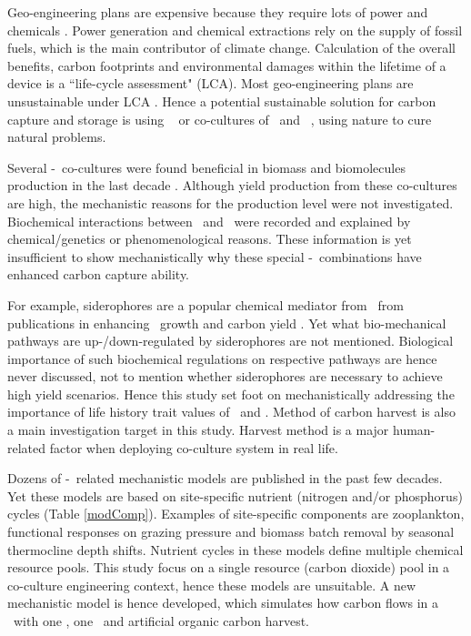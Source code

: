 \documentclass[../thesis.tex]{subfiles} %
\begin{document}
Geo-engineering plans are expensive because they require lots of power and chemicals \autocite{boyd2008ranking,boyd2008implications,mcclellan2012cost}.  Power generation and chemical extractions rely on the supply of fossil fuels, which is the main contributor of climate change.  Calculation of the overall benefits, carbon footprints and environmental damages within the lifetime of a device is a ``life-cycle assessment" (LCA).  Most geo-engineering plans are unsustainable under LCA \autocite{abdussalam2020green}.  Hence a potential sustainable solution for carbon capture and storage is using \phy\ \autocite{farrelly2013carbon} or co-cultures of \phy\ and \bac\ \autocite{fuentes2016impact}, using nature to cure natural problems.

Several \phy-\bac\ co-cultures were found beneficial in biomass and biomolecules production in the last decade \autocite{fuentes2016impact,santos2014microalgal}.  Although yield production from these co-cultures are high, the mechanistic reasons for the production level were not investigated.  Biochemical interactions between \phy\ and \bac\ were recorded and explained by chemical/genetics \autocite{amin2009photolysis,durham2015cryptic,leyva2014accumulation,rivas2010interactions,seyedsayamdost2011roseobacticides} or phenomenological \autocite{choix2012enhanced1,choix2012enhanced2,kazamia2012mutualistic,santos2014microalgal} reasons.  These information is yet insufficient to show mechanistically why these special \phy-\bac\ combinations have enhanced carbon capture ability.

For example, siderophores are a popular chemical mediator from \bac\ from publications in enhancing \phy\ growth and carbon yield \autocite{fuentes2016impact}.  Yet what bio-mechanical pathways are up-/down-regulated by siderophores are not mentioned.  Biological importance of such biochemical regulations on respective pathways are hence never discussed, not to mention whether siderophores are necessary to achieve high yield scenarios.  Hence this study set foot on mechanistically addressing the importance of life history trait values of \phy\ and \bac.  Method of carbon harvest is also a main investigation target in this study.  Harvest method is a major human-related factor when deploying co-culture system in real life.

Dozens of \phy-\bac\ related mechanistic models are published in the past few decades.  Yet these models are based on site-specific nutrient (nitrogen and/or phosphorus) cycles (Table \ref{modComp}).  Examples of site-specific components are zooplankton, functional responses on grazing pressure and biomass batch removal by seasonal thermocline depth shifts.  Nutrient cycles in these models define multiple chemical resource pools.  This study focus on a single resource (carbon dioxide) pool in a co-culture engineering context, hence these models are unsuitable.  A new mechanistic model is hence developed, which simulates how carbon flows in a \pbs\ with one \phy, one \bac\ and artificial organic carbon harvest.
\end{document}
